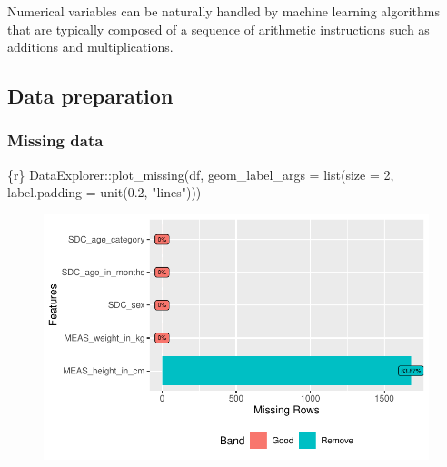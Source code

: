 \documentclass[
  letterpaper,
  DIV=11,
  numbers=noendperiod,
  oneside]{scrreprt}
\newenvironment{Shaded}{\begin{snugshade}}{\end{snugshade}}
\newcommand{\AttributeTok}[1]{\textcolor[rgb]{0.40,0.45,0.13}{#1}}
\newcommand{\DecValTok}[1]{\textcolor[rgb]{0.68,0.00,0.00}{#1}}
\newcommand{\FloatTok}[1]{\textcolor[rgb]{0.68,0.00,0.00}{#1}}
\newcommand{\FunctionTok}[1]{\textcolor[rgb]{0.28,0.35,0.67}{#1}}
\newcommand{\InformationTok}[1]{\textcolor[rgb]{0.37,0.37,0.37}{#1}}
\newcommand{\NormalTok}[1]{\textcolor[rgb]{0.00,0.23,0.31}{#1}}
\newcommand{\SpecialCharTok}[1]{\textcolor[rgb]{0.37,0.37,0.37}{#1}}
\newcommand{\StringTok}[1]{\textcolor[rgb]{0.13,0.47,0.30}{#1}}
\begin{document}
Numerical variables can be naturally handled by machine learning
algorithms that are typically composed of a sequence of arithmetic
instructions such as additions and multiplications.

\hypertarget{data-preparation-1}{%
\subsection{Data preparation}\label{data-preparation-1}}

\hypertarget{missing-data}{%
\subsubsection{Missing data}\label{missing-data}}

\begin{Shaded}
\begin{Highlighting}[]
\InformationTok{\textasciigrave{}\textasciigrave{}\textasciigrave{}\{r\}}
\NormalTok{DataExplorer}\SpecialCharTok{::}\FunctionTok{plot\_missing}\NormalTok{(df,}
                           \AttributeTok{geom\_label\_args =} \FunctionTok{list}\NormalTok{(}\AttributeTok{size =} \DecValTok{2}\NormalTok{, }\AttributeTok{label.padding =} \FunctionTok{unit}\NormalTok{(}\FloatTok{0.2}\NormalTok{, }\StringTok{"lines"}\NormalTok{)))}
\InformationTok{\textasciigrave{}\textasciigrave{}\textasciigrave{}}
\end{Highlighting}
\end{Shaded}

\begin{figure}[H]

{\centering \includegraphics{./ds4ph_day3_session01_practical_session_files/figure-pdf/unnamed-chunk-6-1.pdf}

}

\end{figure}
\end{document}
